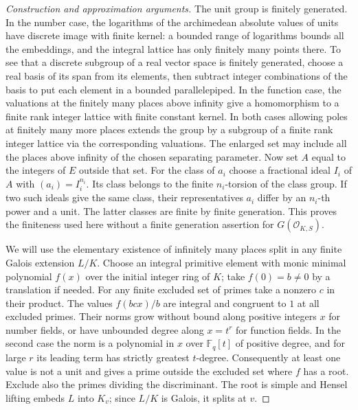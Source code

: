 \documentclass[11pt,a4paper,openany,oneside]{book}
\theoremstyle{resultstyle}
\theoremstyle{definition}
\numberwithin{equation}{chapter}
\newcommand{\OO}{\mathcal{O}}
\newcommand{\FF}{\mathbb{F}}
\begin{document}
\begin{proof}[Construction and approximation arguments]
The unit group is finitely generated. In the number
case, the logarithms of the archimedean absolute
values of units have discrete image with finite kernel:
a bounded range of logarithms bounds all the
embeddings, and the integral lattice has only finitely
many points there. To see that a discrete subgroup
of a real vector space is finitely generated, choose
a real basis of its span from its elements, then
subtract integer combinations of the basis to put
each element in a bounded parallelepiped. In the
function case, the valuations at the finitely many
places above infinity give a homomorphism to a finite
rank integer lattice with finite constant kernel.
In both cases allowing poles at finitely many more
places extends the group by a subgroup of a finite
rank integer lattice via the corresponding valuations.
The enlarged set may include all the places above
infinity of the chosen separating parameter. Now set
$A$ equal to the integers of $E$ outside that set.
For the class of $a_i$ choose a fractional ideal
$I_i$ of $A$ with $(a_i)=I_i^{n_i}$.
Its class belongs to the finite $n_i$-torsion of the
class group. If two such ideals give the same class,
their representatives $a_i$ differ by an $n_i$-th
power and a unit. The latter classes are finite
by finite generation. This proves the finiteness
used here without a finite generation assertion for
$G(\OO_{K,S})$.

We will use the elementary existence of infinitely many
places split in any finite Galois extension $L/K$.
Choose an integral primitive element with monic minimal
polynomial $f(x)$ over the initial integer ring of $K$;
take $f(0)=b\ne 0$ by a translation if needed. For any
finite excluded set of primes take a nonzero $c$ in
their product. The values $f(bcx)/b$ are integral
and congruent to $1$ at all excluded primes.
Their norms grow without bound along positive integers
$x$ for number fields, or have unbounded degree along
$x=t^r$ for function fields. In the second case the
norm is a polynomial in $x$ over $\FF_q[t]$ of
positive degree, and for large $r$ its leading term
has strictly greatest $t$-degree. Consequently at
least one value is not a unit and gives a prime outside
the excluded set where $f$ has a root. Exclude also
the primes dividing the discriminant. The root is
simple and Hensel lifting embeds $L$ into $K_v$;
since $L/K$ is Galois, it splits at $v$.


\end{proof}
\end{document}
